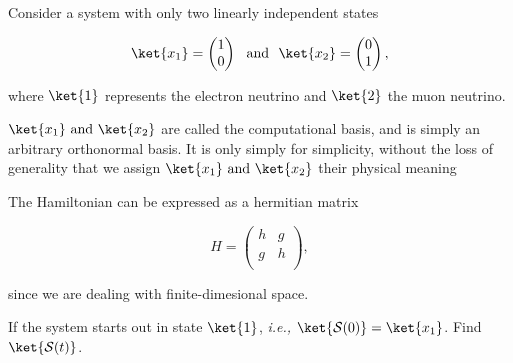 \documentclass[a4paper,12pt]{report}
\begin{document}
{Consider a system with only two linearly independent states 

\begin{equation}
  \ket{x_1} = \begin{pmatrix}
     1 \\
     0 \\
  \end{pmatrix} ~\text { and }~ \ket{x_2} = \begin{pmatrix}
     0 \\
     1 \\
  \end{pmatrix}, 
\end{equation}

where \(\ket{1} \) represents the electron neutrino and \(\ket{2} \) the muon neutrino. 

\(\ket{x_1} \text { and } \ket{x_2 }  \) are called the computational basis, and is simply an arbitrary orthonormal basis. It is only simply for simplicity, without the loss of generality that we assign \(\ket{x_1} \text { and } \ket{x_2 }  \) their physical meaning 

The Hamiltonian can be expressed as a hermitian matrix 

\begin{equation}
  H = \begin{pmatrix}
    h &  g \\
    g &  h \\
  \end{pmatrix},
\end{equation}

since we are dealing with finite-dimesional space. 

If the system starts out in state \(\ket{1} \), \textit{i.e.,} \(\ket{\mathcal{S}(0)} = \ket{x_1}  \). Find \(\ket{\mathcal{S}(t)} \).  
}
\end{document}
